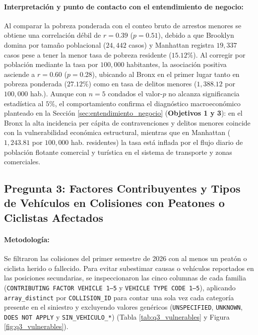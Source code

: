 \documentclass[11pt,a4paper]{article}
\begin{document}
\paragraph{Interpretación y punto de contacto con el entendimiento de negocio:}
Al comparar la pobreza ponderada con el conteo bruto de arrestos menores se obtiene una correlación débil de $r = 0.39$ ($p = 0.51$), debido a que Brooklyn domina por tamaño poblacional ($24,442$ casos) y Manhattan registra $19,337$ casos pese a tener la menor tasa de pobreza residente ($15.12\%$). Al corregir por población mediante la tasa por $100,000$ habitantes, la asociación positiva asciende a $r = 0.60$ ($p = 0.28$), ubicando al Bronx en el primer lugar tanto en pobreza ponderada ($27.12\%$) como en tasa de delitos menores ($1,388.12$ por $100,000$ hab.). Aunque con $n = 5$ condados el valor-$p$ no alcanza significancia estadística al $5\%$, el comportamiento confirma el diagnóstico macroeconómico planteado en la Sección \ref{sec:entendimiento_negocio} (\textbf{Objetivos 1 y 3}): en el Bronx la alta incidencia per cápita de contravenciones y delitos menores coincide con la vulnerabilidad económica estructural, mientras que en Manhattan ($1,243.81$ por $100,000$ hab. residentes) la tasa está inflada por el flujo diario de población flotante comercial y turística en el sistema de transporte y zonas comerciales.

\subsection{Pregunta 3: Factores Contribuyentes y Tipos de Vehículos en Colisiones con Peatones o Ciclistas Afectados}
\label{subsec:respuesta_q3}

\paragraph{Metodología:} Se filtraron las colisiones del primer semestre de 2026 con al menos un peatón o ciclista herido o fallecido. Para evitar subestimar causas o vehículos reportados en las posiciones secundarias, se inspeccionaron las cinco columnas de cada familia (\texttt{CONTRIBUTING FACTOR VEHICLE 1--5} y \texttt{VEHICLE TYPE CODE 1--5}), aplicando \texttt{array\_distinct} por \texttt{COLLISION\_ID} para contar una sola vez cada categoría presente en el siniestro y excluyendo valores genéricos (\texttt{UNSPECIFIED}, \texttt{UNKNOWN}, \texttt{DOES NOT APPLY} y \texttt{SIN\_VEHICULO\_*}) (Tabla \ref{tab:q3_vulnerables} y Figura \ref{fig:q3_vulnerables}).
\end{document}
